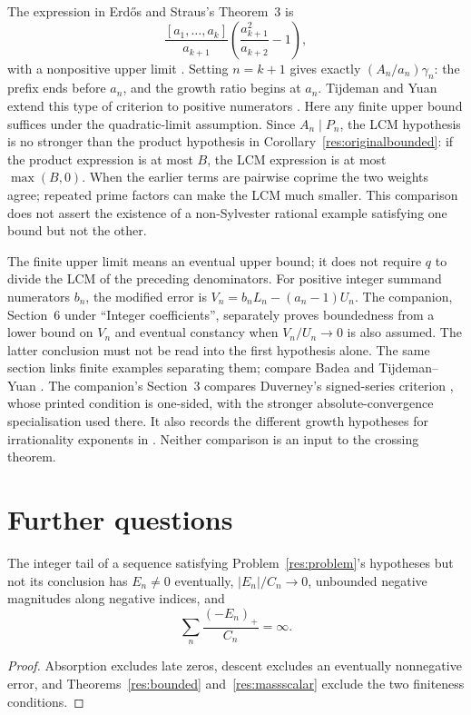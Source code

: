 \documentclass[11pt]{article}
\begin{document}
The expression in Erd\H{o}s and Straus's Theorem~3 is
\[
 \frac{[a_1,\ldots,a_k]}{a_{k+1}}
 \left(\frac{a_{k+1}^2}{a_{k+2}}-1\right),
\]
with a nonpositive upper limit \cite[p.~132]{erdosstraus1964}.
Setting $n=k+1$ gives exactly $(A_n/a_n)\gamma_n$: the prefix ends
before $a_n$, and the growth ratio begins at $a_n$.
Tijdeman and Yuan extend this type of criterion to positive numerators
\cite{tijdemanyuan2002}. Here any finite upper bound suffices under
the quadratic-limit assumption. Since $A_n\mid P_n$,
the LCM hypothesis is no stronger than the product hypothesis in
Corollary~\ref{res:originalbounded}: if the product expression is at most
$B$, the LCM expression is at most $\max(B,0)$. When the earlier terms
are pairwise coprime the two weights agree; repeated prime factors can
make the LCM much smaller. This comparison does not assert the existence
of a non-Sylvester rational example satisfying one bound but not the other.


The finite upper limit means an eventual upper bound; it does not require
$q$ to divide the LCM of the preceding denominators.
For positive integer summand numerators $b_n$, the modified error is
$V_n=b_nL_n-(a_n-1)U_n$. The companion, Section~6 under ``Integer
coefficients'', separately proves boundedness from a lower bound on
$V_n$ and eventual constancy when $V_n/U_n\to0$ is also assumed.
The latter conclusion must not be read into the first hypothesis alone.
The same section links finite examples separating them; compare Badea
\cite[p.~316]{badea1993} and Tijdeman--Yuan \cite{tijdemanyuan2002}.
The companion's Section~3 compares Duverney's signed-series criterion
\cite[Corollary~3.2, p.~287]{duverney2001}, whose printed condition is
one-sided, with the stronger absolute-convergence specialisation used
there. It also records the different growth hypotheses for irrationality
exponents in \cite[Theorem~1, author-version p.~2]{duverneykurosawashiokawa2020}.
Neither comparison is an input to the crossing theorem.

\section{Further questions}\label{sec:open}
\begin{proposition}\label{res:frontier}
The integer tail of a sequence satisfying Problem~\ref{res:problem}'s
hypotheses but not its conclusion has $E_n\ne0$ eventually,
$|E_n|/C_n\to0$, unbounded negative magnitudes along negative indices,
and
\[
 \sum_n\frac{(-E_n)_+}{C_n}=\infty.
\]
\end{proposition}
\begin{proof}
Absorption excludes late zeros, descent excludes an eventually
nonnegative error, and Theorems~\ref{res:bounded} and~\ref{res:massscalar}
exclude the two finiteness conditions.
\end{proof}
\end{document}
